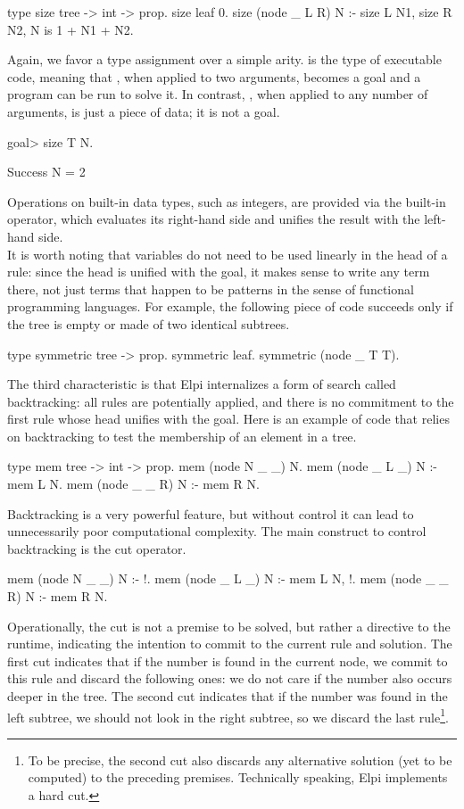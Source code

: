 \documentclass[a4paper, 11pt]{book}
\begin{document}
\begin{elpicode}
type size tree -> int -> prop.
size leaf 0.
size (node _ L R) N :- size L N1, size R N2, N is 1 + N1 + N2.
\end{elpicode}

Again, we favor a type assignment over a simple arity.  is the type
of executable code, meaning that , when applied to two arguments,
becomes a goal and a program can be run to solve it. In contrast, ,
when applied to any number of arguments, is just a piece of data; it is not a
goal.

\begin{elpicode}
goal> size T N.

Success
  N = 2
\end{elpicode}
Operations on built-in data types, such as integers, are provided via the
built-in  operator, which evaluates its right-hand side and unifies
the result with the left-hand side.
~\\
It is worth noting that variables do not need to be used linearly in the head
of a rule: since the head is unified with the goal, it makes sense to write
any term there, not just terms that happen to be patterns in the sense of
functional programming languages. For example, the following piece of code
succeeds only if the tree is empty or made of two identical subtrees.

\begin{elpicode}
type symmetric tree -> prop.
symmetric leaf.
symmetric (node _ T T).
\end{elpicode}

The third characteristic is that Elpi internalizes a form of search called
backtracking: all rules are potentially applied, and there is no commitment to
the first rule whose head unifies with the goal. Here is an example of code
that relies on backtracking to test the membership of an element in a tree.

\begin{elpicode}
type mem tree -> int -> prop.
mem (node N _ _) N.
mem (node _ L _) N :- mem L N.
mem (node _ _ R) N :- mem R N.
\end{elpicode}
Backtracking is a very powerful feature, but without control it can lead to
unnecessarily poor computational complexity. The main construct to control
backtracking is the cut operator.

\begin{elpicode}
mem (node N _ _) N :- !.
mem (node _ L _) N :- mem L N, !.
mem (node _ _ R) N :- mem R N.
\end{elpicode}
Operationally, the cut is not a premise to be solved, but rather a directive
to the runtime, indicating the intention to commit to the current rule and
solution. The first cut indicates that if the number is found in the current
node, we commit to this rule and discard the following ones: we do not care if
the number also occurs deeper in the tree. The second cut indicates that if
the number was found in the left subtree, we should not look in the right
subtree, so we discard the last rule\footnote{To be precise, the second cut
also discards any alternative solution (yet to be computed) to the preceding
premises. Technically speaking, Elpi implements a hard cut.}.
\end{document}
